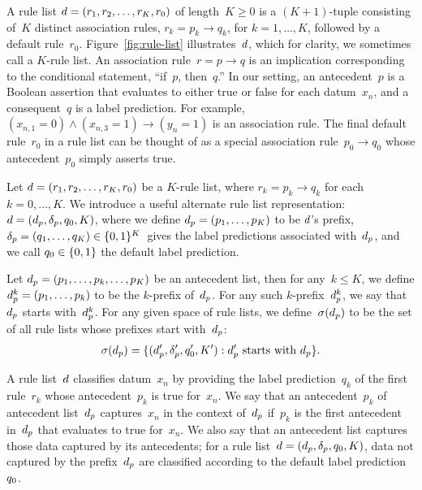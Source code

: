A rule list ${{d} = (r_1, r_2, \dots, r_K, r_0)}$ of length~${K \ge 0}$
is a ${(K+1)}$-tuple consisting of~$K$ distinct association rules,
${r_k = p_k \rightarrow q_k}$, for ${k = 1, \dots, K}$,
followed by a default rule~$r_0$.
%
Figure~\ref{fig:rule-list} illustrates~${d}$,
which for clarity, we sometimes call a $K$-rule list.
%
An association rule~${r = p \rightarrow q}$ is an implication
corresponding to the conditional statement, ``if~$p$, then~$q$.''
%
In our setting, an antecedent~$p$ is a Boolean assertion that
evaluates to either true or false for each datum~$x_n$,
and a consequent~$q$ is a label prediction.
%
For example, ${(x_{n, 1} = 0) \wedge (x_{n, 3} = 1) \rightarrow (y_n = 1)}$
is an association rule.
%
%
The final default rule~$r_0$ in a rule list can be thought of
as a special association rule~${p_0 \rightarrow q_0}$
whose antecedent~$p_0$ simply asserts true.

Let ${{d} = (r_1, r_2, \dots, r_K, r_0)}$ be a $K$-rule list,
where ${r_k = p_k \rightarrow q_k}$ for each ${k = 0, \dots, K}$.
%
We introduce a useful alternate rule list representation:
${{d} = (d_p, \delta_p, q_0, K)}$,
where we define ${d_p = (p_1, \dots, p_K)}$ to be ${d}$'s prefix,
${\delta_p = (q_1, \dots, q_K) \in \{0, 1\}^K}$~gives
the label predictions associated with~$d_p$,
and we call ${q_0 \in \{0, 1\}}$ the default label prediction.

Let ${d_p = (p_1, \dots, p_k, \dots, p_K)}$ be an antecedent list,
then for any~${k \le K}$, we define ${d_p^k = (p_1, \dots, p_k)}$
to be the $k$-prefix of~$d_p$.
%
For any such $k$-prefix~$d_p^k$,
we say that~$d_p$ starts with~$d_p^k$.
%
For any given space of rule lists,
we define~$\sigma(d_p)$ to be the set of
all rule lists whose prefixes start with~$d_p$:
\begin{align}
\StartsWith(\Prefix) =
\{(\Prefix', \Labels', \Default', K') : \Prefix' \textnormal{ starts with } \Prefix \}.
\end{align}

A rule list~${d}$ classifies datum~$x_n$ by providing the label prediction~$q_k$
of the first rule~$r_k$ whose antecedent~$p_k$ is true for~$x_n$.
%
We say that an antecedent~$p_k$ of antecedent list~$d_p$ captures~$x_n$
in the context of~$d_p$ if~$p_k$ is the first antecedent in~$d_p$ that
evaluates to true for~$x_n$.
%
We also say that an antecedent list captures those data captured by its antecedents;
for a rule list~${{d} = (d_p, \delta_p, q_0, K)}$,
data not captured by the prefix~$d_p$
are classified according to the default label prediction~$q_0$.

